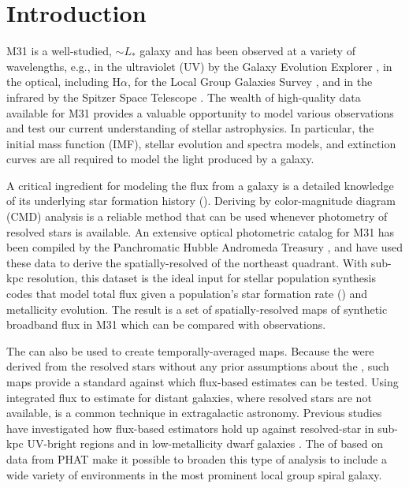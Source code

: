 \documentclass[iop, tighten]{emulateapj}
\begin{document}





\section{Introduction}

M31 is a well-studied, $\sim L_\ast$ galaxy and has been observed at a variety
of wavelengths, e.g., in the ultraviolet (UV) by the Galaxy Evolution Explorer
\citep[GALEX;][]{Morrissey:2007}, in the optical, including H$\alpha$, for the
Local Group Galaxies Survey \citep{Massey:2006}, and in the infrared by the
Spitzer Space Telescope \citep{Gordon:2006}. The wealth of high-quality data
available for M31 provides a valuable opportunity to model various observations
and test our current understanding of stellar astrophysics. In particular, the
initial mass function (IMF), stellar evolution and spectra models, and
extinction curves are all required to model the light produced by a galaxy.

A critical ingredient for modeling the flux from a galaxy is a detailed
knowledge of its underlying star formation history (\sfh{}). Deriving 
by color-magnitude diagram (CMD) analysis is a reliable method that can be used
whenever photometry of resolved stars is available. An extensive optical
photometric catalog for M31 has been compiled by the Panchromatic Hubble
Andromeda Treasury \citep[PHAT][]{Dalcanton:2012}, and \citet{Lewis:2014} have
used these data to derive the spatially-resolved \sfh{} of the northeast
quadrant. With sub-kpc resolution, this \sfh{} dataset is the ideal input for
stellar population synthesis codes that model total flux given a population's
star formation rate (\sfr{}) and metallicity evolution. The result is a set of
spatially-resolved maps of synthetic broadband flux in M31 which can be
compared with observations.

\figmap

The \citet{Lewis:2014}  can also be used to create temporally-averaged
\sfr{} maps. Because the  were derived from the resolved stars without
any prior assumptions about the , such maps provide a standard against
which flux-based \sfr{} estimates \citep[e.g., using any of the calibrations
from][]{Kennicutt:2012} can be tested. Using integrated flux to estimate
 for distant galaxies, where resolved stars are not available, is a
common technique in extragalactic astronomy. Previous studies have investigated
how flux-based \sfr{} estimators hold up against resolved-star  in
sub-kpc UV-bright regions \citep{Simones:2014} and in low-metallicity dwarf
galaxies \citep{McQuinn:2014}. The  of \citet{Lewis:2014} based on data
from PHAT make it possible to broaden this type of analysis to include a wide
variety of environments in the most prominent local group spiral galaxy.
\end{document}

